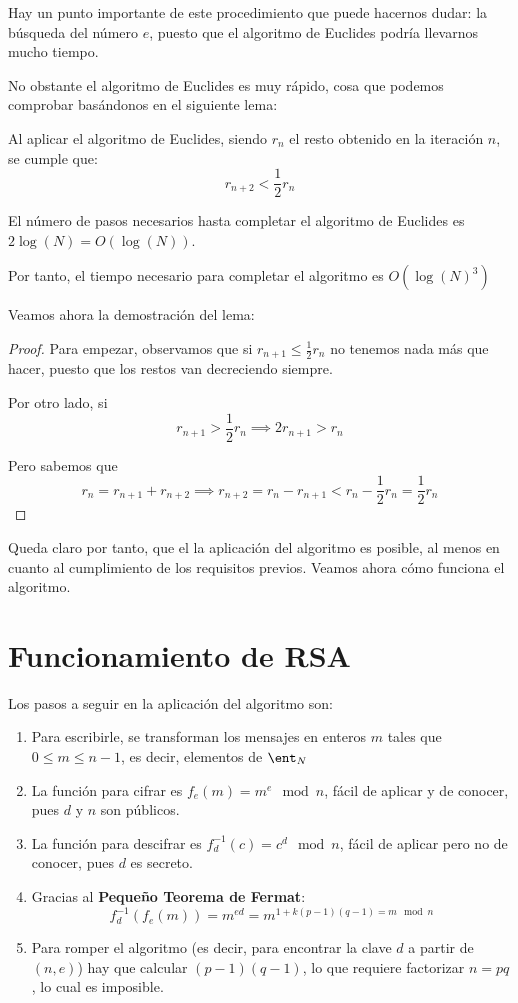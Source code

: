 Hay un punto importante de este procedimiento que puede hacernos dudar: la búsqueda del número $e$, puesto que el algoritmo de Euclides podría llevarnos mucho tiempo.

No obstante el algoritmo de Euclides es muy rápido, cosa que podemos comprobar basándonos en el siguiente lema:
\begin{lemma}
Al aplicar el algoritmo de Euclides, siendo $r_n$ el resto obtenido en la iteración $n$, se cumple que:
\[r_{n+2} < \frac{1}{2}r_n\]
\end{lemma}
\begin{corol}
El número de pasos necesarios hasta completar el algoritmo de Euclides es $2\log(N)=O(\log(N))$.

Por tanto, el tiempo necesario para completar el algoritmo es $O(\log(N)^3)$
\end{corol}

Veamos ahora la demostración del lema:
\begin{proof}
Para empezar, observamos que si $r_{n+1} \leq \frac{1}{2}r_n$ no tenemos nada más que hacer, puesto que los restos van decreciendo siempre.

Por otro lado, si 
\[r_{n+1} > \frac{1}{2} r_n \implies 2r_{n+1} > r_n\]

Pero sabemos que 
\[r_n = r_{n+1} + r_{n+2} \implies r_{n+2} = r_n-r_{n+1} < r_n-\frac{1}{2}r_n = \frac{1}{2}r_n\] 
\end{proof}

Queda claro por tanto, que el la aplicación del algoritmo es posible, al menos en cuanto al cumplimiento de los requisitos previos. Veamos ahora cómo funciona el algoritmo.

\section{Funcionamiento de RSA}
Los pasos a seguir en la aplicación del algoritmo son:
\begin{enumerate}
\item Para escribirle, se transforman los mensajes en enteros $m$ tales que $0 \leq m \leq n-1$, es decir, elementos de $\ent_N$

\item La función para cifrar es $f_e(m)=m^e \mod n$, fácil de aplicar y de conocer, pues $d$ y $n$ son públicos.

\item La función para descifrar es $f_d^{-1}(c)=c^d \mod n$, fácil de aplicar pero no de conocer, pues $d$ es secreto.

\item Gracias al \textbf{Pequeño Teorema de Fermat}:
\[f_d^{-1}(f_e(m)) = m^{ed} = m^{1+k(p-1)(q-1) = m \mod n}\]

\item Para romper el algoritmo (es decir, para encontrar la clave $d$ a partir de $(n,e)$) hay que calcular $(p-1)(q-1)$, lo que requiere factorizar $n=pq$, lo cual es imposible.

\end{enumerate}